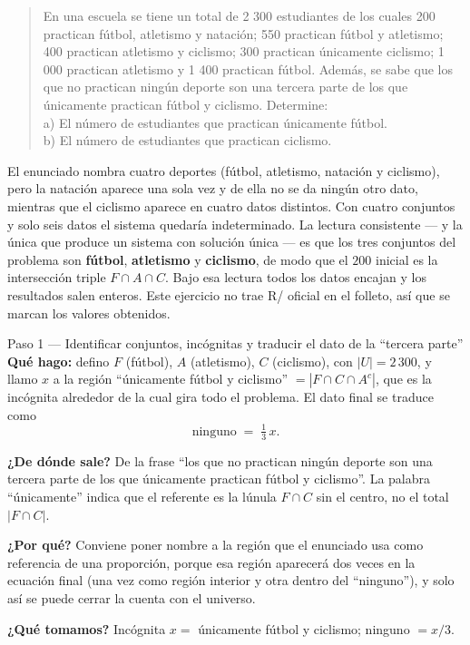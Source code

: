 \documentclass[11pt]{article}
\begin{document}
\begin{quote}
En una escuela se tiene un total de 2 300 estudiantes de los cuales 200 practican fútbol, atletismo y
natación; 550 practican fútbol y atletismo; 400 practican atletismo y ciclismo; 300 practican únicamente
ciclismo; 1 000 practican atletismo y 1 400 practican fútbol. Además, se sabe que los que no practican
ningún deporte son una tercera parte de los que únicamente practican fútbol y ciclismo. Determine:\\
a) El número de estudiantes que practican únicamente fútbol.\\
b) El número de estudiantes que practican ciclismo.
\end{quote}

\begin{nota}
El enunciado nombra cuatro deportes (fútbol, atletismo, natación y ciclismo), pero la natación aparece
una sola vez y de ella no se da ningún otro dato, mientras que el ciclismo aparece en cuatro datos
distintos. Con cuatro conjuntos y solo seis datos el sistema quedaría indeterminado. La lectura
consistente --- y la única que produce un sistema con solución única --- es que los tres conjuntos del
problema son \textbf{fútbol}, \textbf{atletismo} y \textbf{ciclismo}, de modo que el $200$ inicial es la
intersección triple $F\cap A\cap C$. Bajo esa lectura todos los datos encajan y los resultados salen
enteros. Este ejercicio no trae R/ oficial en el folleto, así que se marcan los valores obtenidos.
\end{nota}

\begin{paso}{Paso 1 --- Identificar conjuntos, incógnitas y traducir el dato de la ``tercera parte''}
\textbf{Qué hago:} defino $F$ (fútbol), $A$ (atletismo), $C$ (ciclismo), con $|U|=2\,300$, y llamo
$x$ a la región ``únicamente fútbol y ciclismo'' $=|F\cap C\cap A^{c}|$, que es la incógnita alrededor de
la cual gira todo el problema. El dato final se traduce como
\[
\text{ninguno} \;=\; \tfrac{1}{3}\,x .
\]

\textbf{¿De dónde sale?} De la frase ``los que no practican ningún deporte son una tercera parte de los
que únicamente practican fútbol y ciclismo''. La palabra ``únicamente'' indica que el referente es la
lúnula $F\cap C$ sin el centro, no el total $|F\cap C|$.

\textbf{¿Por qué?} Conviene poner nombre a la región que el enunciado usa como referencia de una
proporción, porque esa región aparecerá dos veces en la ecuación final (una vez como región interior y
otra dentro del ``ninguno''), y solo así se puede cerrar la cuenta con el universo.

\textbf{¿Qué tomamos?} Incógnita $x=$ únicamente fútbol y ciclismo; ninguno $=x/3$.
\end{paso}
\end{document}
